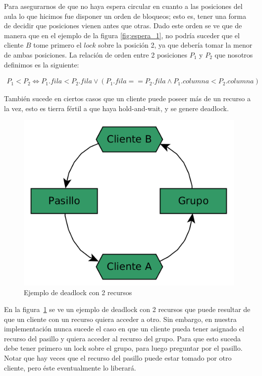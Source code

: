 Para asegurarnos de que no haya espera circular en cuanto a las posiciones del aula lo que hicimos fue disponer un orden de bloqueos; esto es, tener una forma de decidir que posiciones vienen antes que otras. Dado este orden se ve que de manera que en el ejemplo de la figura \ref{fig:espera_1}, no podría suceder que el cliente $B$ tome primero el $lock$ sobre la posición 2, ya que debería tomar la menor de ambas posiciones. La relación de orden entre 2 posiciones $P_{1}$ y $P_{2}$ que nosotros definimos es la siguiente:

\begin{align*}
	P_{1} < P_{2} \iff P_{1}.fila < P_{2}.fila \lor (P_{1}.fila == P_{2}.fila \land P_{1}.columna < P_{2}.columna)
\end{align*}

También sucede en ciertos casos que un cliente puede poseer más de un recurso a la vez, esto es tierra fértil a que haya hold-and-wait, y se genere deadlock.

\begin{figure}[H]
	\centering
	\includegraphics[scale=0.35]{imgs/deadlock_2.png}
	\caption{Ejemplo de deadlock con 2 recursos}
	\label{fig:hold_and_wait_1}
\end{figure}

En la figura~\ref{fig:hold_and_wait_1} se ve un ejemplo de deadlock con 2 recursos que puede resultar de que un cliente con un recurso quiera acceder a otro. Sin embargo, en nuestra implementación nunca sucede el caso en que un cliente pueda tener asignado el recurso del pasillo y quiera acceder al recurso del grupo. Para que esto suceda debe tener primero un lock sobre el grupo, para luego preguntar por el pasillo. Notar que hay veces que el recurso del pasillo puede estar tomado por otro cliente, pero éste eventualmente lo liberará.

